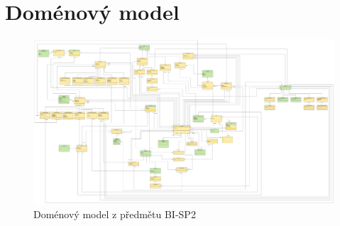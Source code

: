 \chapter{Doménový model}\label{dodatek:DomainModel}
    \begin{figure}\centering
	    \includegraphics[angle=90, width=1.0\textwidth]{pdfs/Domain-Model}
	    \caption[Doménový model]{Doménový model z předmětu BI-SP2}\label{image:DomainModel}
    \end{figure}